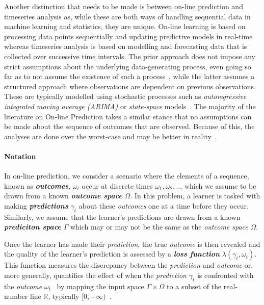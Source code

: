 Another distinction that needs to be made is between on-line prediction and timeseries analysis as, while these are both ways of handling sequential data in machine learning and statistics, they are unique. On-line learning is based on processing data points sequentially and updating predictive models in real-time whereas timeseries analysis is based on modelling and forecasting data that is collected over successive time intervals. The prior approach does not impose any strict assumptions about the underlying data-generating process, even going so far as to not assume the existence of such a process~\cite{vovk:2001}, while the latter assumes a structured approach where observations are dependent on previous observations. These are typically modelled using stochastic processes such as \textit{autoregressive integrated moving average (ARIMA)} or \textit{state-space} models~\cite{box:2015}. The majority of the literature on On-line Prediction takes a similar stance that no assumptions can be made about the sequence of outcomes that are observed. Because of this, the analyses are done over the worst-case and may be better in reality~\cite{cesa-bianchi:1997}.

\paragraph*{Notation}
In on-line prediction, we consider a scenario where the elements of a sequence, known as \textit{\textbf{outcomes}}, $\omega_t$ occur at discrete times $\omega_1, \omega_2, \ldots$ which we assume to be drawn from a known \textit{\textbf{outcome space}} $\Omega$. In this problem, a learner is tasked with making \textit{\textbf{predictions}} $\gamma_t$ about these \textit{outcomes} one at a time before they occur. Similarly, we assume that the learner's predictions are drawn from a known \textit{\textbf{prediciton space}} $\Gamma$ which may or may not be the same as the \textit{outcome space} $\Omega$. 

Once the learner has made their \textit{prediction}, the true \textit{outcome} is then revealed and the quality of the learner's prediction is assessed by a \textit{\textbf{loss function}} $\lambda(\gamma_t, \omega_t)$. This function measures the discrepancy between the \textit{prediction} and \textit{outcome} or, more generally, quantifies the effect of when the \textit{prediction} $\gamma_t$ is confronted with the \textit{outcome} $\omega_t$~\cite{adamskiy:2019} by mapping the input space $\Gamma \times \Omega$ to a subset of the real-number line $\mathbb{R}$, typically $[0, +\infty)$~\cite{kalnishkan:2009}.

